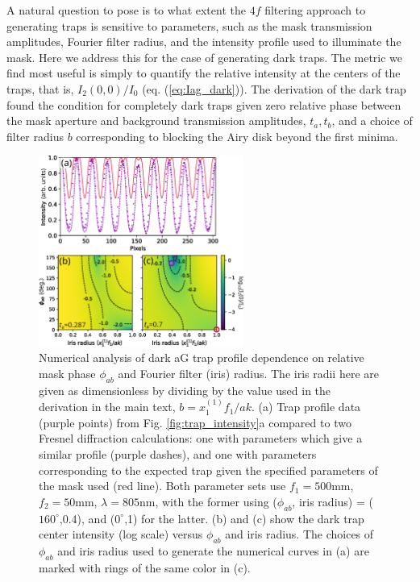 A natural question to pose is to what extent the $4f$ filtering approach to generating traps is sensitive to parameters, such as the mask transmission amplitudes, Fourier filter radius, and the intensity profile used to illuminate the mask. Here we address this for the case of generating dark traps. The metric we find most useful is simply to quantify the relative intensity at the centers of the traps, that is, $I_2(0,0)/I_0$ (eq. (\ref{eq:Iag_dark})). The derivation of the dark trap found the condition for completely dark traps given zero relative phase between the mask aperture and background transmission amplitudes, $t_a,t_b$, and a choice of filter radius $b$ corresponding to blocking the Airy disk beyond the first minima. 
\begin{figure}[!ht]
    \centering
    \includegraphics[width=0.6\textwidth]{Images/figure5.eps}
    \caption{Numerical analysis of dark aG trap profile dependence on relative mask phase $\phi_{ab}$ and Fourier filter (iris) radius. The iris radii here are given as dimensionless by dividing by the value used in the derivation in the main text, $b=x^{(1)}_1 f_1/a k$. (a) Trap profile data (purple points) from Fig. \ref{fig:trap_intensity}a compared to two Fresnel diffraction calculations: one with parameters which give a similar profile (purple dashes), and one with parameters corresponding to the expected trap given the specified parameters of the mask used (red line). Both parameter sets  use $f_1=500$mm,$f_2=50$mm, $\lambda=805$nm, with the former using ($\phi_{ab}$, iris radius) = ($160^{\circ}$,0.4), and ($0^{\circ}$,1) for the latter. (b) and (c) show the dark trap center intensity (log scale) versus $\phi_{ab}$ and iris radius. The choices of $\phi_{ab}$ and iris radius used to generate the numerical curves in (a) are marked with rings of the same color in (c).}
    \label{fig:idark_vs_phi_b}
\end{figure}

